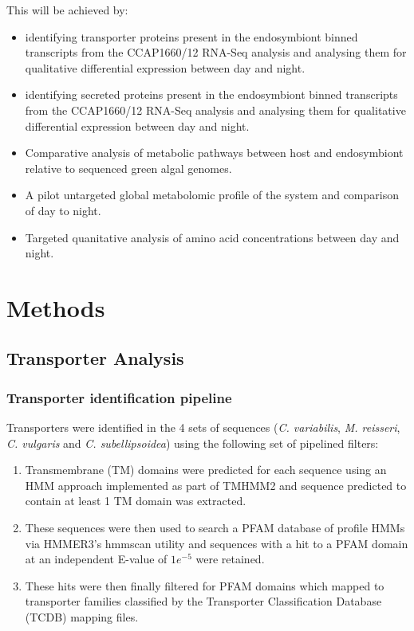 This will be achieved by:
\begin{itemize}
\item identifying
    transporter proteins present in the endosymbiont
    binned transcripts from the CCAP1660/12 RNA-Seq analysis
    and analysing them for qualitative differential 
    expression between day and night. 
\item identifying
    secreted proteins present in the endosymbiont
    binned transcripts from the CCAP1660/12 RNA-Seq analysis
    and analysing them for qualitative differential 
    expression between day and night. 
\item Comparative analysis of metabolic pathways 
    between host and endosymbiont relative to 
    sequenced green algal genomes. 
\item A pilot untargeted global metabolomic profile of the 
    system and comparison of day to night.
\item Targeted quanitative analysis of amino acid concentrations
    between day and night. 
\end{itemize}

\section{Methods}
\subsection{Transporter Analysis} 
\subsubsection{Transporter identification pipeline}
Transporters were identified in the 4 sets of sequences (\textit{C. variabilis}, \textit{M. reisseri},
\textit{C. vulgaris} and \textit{C. subellipsoidea}) using the following set of pipelined filters:
\begin{enumerate}
    \item Transmembrane (TM) domains were predicted for each sequence using an HMM approach implemented as part of TMHMM2 \citep{Sonnhammer1998,Krogh2001}
and sequence predicted to contain at least 1 TM domain was extracted.
    \item These sequences were then used to search a PFAM database of profile HMMs \citep{Eddy1998} via HMMER3's hmmscan utility \citep{Eddy1995,Johnson2010,Eddy2011,Mistry2013}
        and sequences with a hit to a PFAM domain at an independent E-value of \(1e^{-5}\) were retained.
    \item These hits were then finally filtered for PFAM domains which mapped to transporter families classified by the Transporter Classification Database (TCDB) \citep{Saier2006,Saier2008,Saier2009,Saier2014}
        mapping files.
\end{enumerate}

